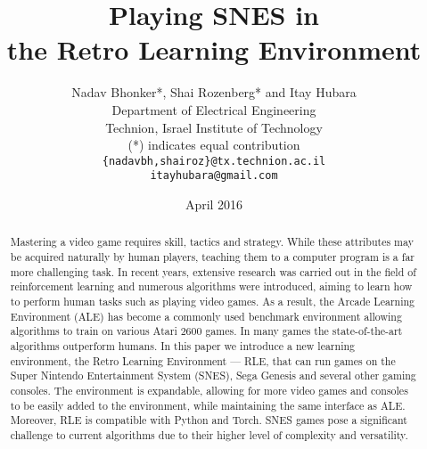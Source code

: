 \documentclass{article}
\title{Playing SNES in \\the Retro Learning Environment}
\author{Nadav Bhonker*, Shai Rozenberg* and Itay Hubara\\
Department of Electrical Engineering\\
Technion, Israel Institute of Technology\\
(*) indicates equal contribution\\
\texttt{\{nadavbh,shairoz\}@tx.technion.ac.il} \\
\texttt{itayhubara@gmail.com} \\
}
\date{April 2016}
\begin{document}
\maketitle

\begin{abstract}
Mastering a video game requires skill, tactics and strategy. While these attributes may be acquired naturally by human players, teaching them to a computer program is a far more challenging task. In recent years, extensive research was carried out in the field of reinforcement learning and numerous algorithms were introduced, aiming to learn how to perform human tasks such as playing video games. As a result, the Arcade Learning Environment (ALE) \citep{bellemare13arcade} has become a commonly used benchmark environment allowing algorithms to train on various Atari 2600 games. In many games the state-of-the-art algorithms outperform humans. In this paper we introduce a new learning environment, the Retro Learning Environment --- RLE, that can run games on the Super Nintendo Entertainment System (SNES), Sega Genesis and several other gaming consoles. The environment is expandable, allowing for more video games and consoles to be easily added to the environment, while maintaining the same interface as ALE. 
Moreover, RLE is compatible with Python and Torch. SNES games pose a significant challenge to current algorithms due to their higher level of complexity and versatility. 

\end{abstract}
\end{document}
